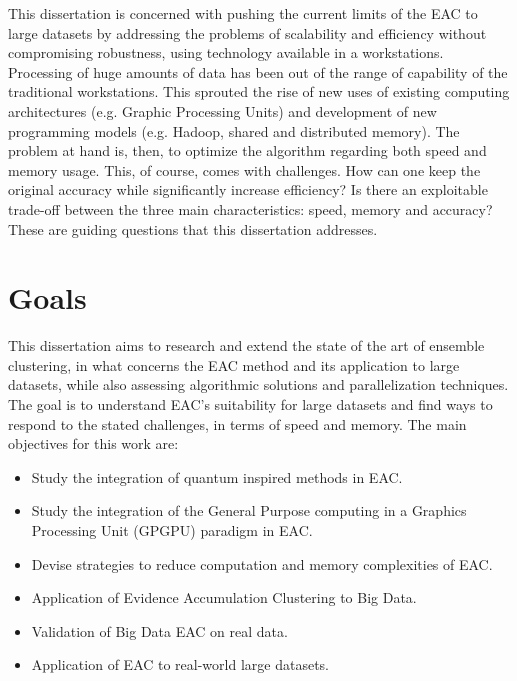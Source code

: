 This dissertation is concerned with pushing the current limits of the EAC to large datasets by addressing the problems of scalability and efficiency without compromising robustness, using technology available in a workstations.
Processing of huge amounts of data has been out of the range of capability of the traditional workstations.
This sprouted the rise of new uses of existing computing architectures (e.g. Graphic Processing Units) and development of new programming models (e.g. Hadoop, shared and distributed memory).
The problem at hand is, then, to  optimize the algorithm regarding both speed and memory usage.
This, of course, comes with challenges.
How can one keep the original accuracy while significantly increase efficiency?
Is there an exploitable trade-off between the three main characteristics: speed, memory and accuracy?
These are guiding questions that this dissertation addresses.


\section{Goals}

This dissertation aims to research and extend the state of the art of ensemble clustering, in what concerns the EAC method and its application to large datasets, while also assessing algorithmic solutions and parallelization techniques.
The goal is to understand EAC's suitability for large datasets and find ways to respond to the stated challenges, in terms of speed and memory.
The main objectives for this work are:

\begin{itemize}

\item Study the integration of quantum inspired methods in EAC.

\item Study the integration of the General Purpose computing in a Graphics Processing Unit (GPGPU) paradigm in EAC.

\item Devise strategies to reduce computation and memory complexities of EAC.

\item Application of Evidence Accumulation Clustering to Big Data.

\item Validation of Big Data EAC on real data.%
\item Application of EAC to real-world large datasets.
\end{itemize}

